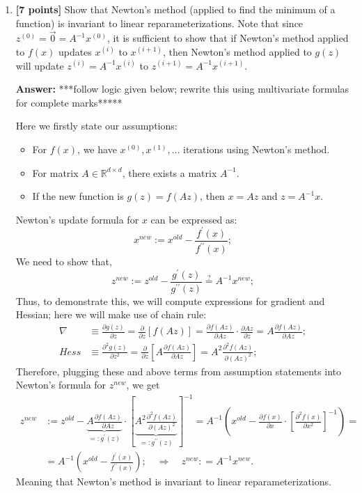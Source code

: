 \documentclass{article}
\begin{document}
\begin{enumerate}[label=\alph*)]
    \item \textbf{[7 points]} Show that Newton's method (applied to find the minimum of a function) is invariant to linear reparameterizations. Note that since $z^{(0)} = \vec{0} = A^{-1}x^{(0)}$, it is sufficient to show that if Newton's method applied to $f(x)$ updates $x^{(i)}$ to $x^{(i+1)}$, then Newton's method applied to $g(z)$ will update $z^{(i)} = A^{-1}x^{(i)}$ to $z^{(i+1)} = A^{-1}x^{(i+1)}$.

\textbf{Answer:}
***follow logic given below; rewrite this using multivariate formulas for complete marks*****

Here we firstly state our assumptions:
\begin{itemize}
\item For $f(x)$, we have $x^{(0)}, x^{(1)}, \ldots$ iterations using Newton's method.
\item For matrix $A \in \mathbb{R}^{d \times d}$, there exists a matrix $A^{-1}$.
\item If the new function is $g(z) = f(Az)$, then $x = Az$ and $z = A^{-1}x$.
\end{itemize}


    Newton's update formula for $x$ can be expressed as:
    \[
    x^{new} := x^{old} - \frac{f^{\prime}(x)}{f^{\prime\prime}(x)};
    \]
    We need to show that,
    \[
     z^{new} := z^{old} - \frac{g^{\prime}(z)}{g^{\prime\prime}(z)} \stackrel{?}{=} A^{-1}x^{new};
    \]
Thus, to demonstrate this, we will compute expressions for gradient and Hessian; here we will make use of chain rule:
\begin{align*}
    \nabla &\equiv\frac{\partial g(z)}{\partial z} = \frac{\partial}{\partial z}\left[ f(Az) \right] = \frac{\partial f(Az)}{\partial Az}\cdot \frac{\partial Az}{\partial z} = A\frac{\partial f(Az)}{\partial Az};\\[8pt]
    Hess &\equiv\frac{\partial^2 g(z)}{\partial z^2} = \frac{\partial}{\partial z}\left[ A\frac{\partial f(Az)}{\partial Az} \right] = A^2\frac{\partial^2 f(Az)}{\partial (Az)^2};
\end{align*}
Therefore, plugging these and above terms from assumption statements into Newton's formula for $z^{new}$, we get
\begin{align*}
 z^{new} &:= z^{old} -  \underbrace{A\frac{\partial f(Az)}{\partial Az}}_{=:g^{\prime}(z)}\cdot\left[\underbrace{A^2\frac{\partial^2 f(Az)}{\partial (Az)^2} }_{=:g^{\prime\prime}(z)}\right]^{-1} =  A^{-1}\left(x^{old} -\frac{\partial f(x)}{\partial x}\cdot \left[\frac{\partial^2 f(x)}{\partial x^2} \right]^{-1} \right) =\\[10pt]
 & = A^{-1}\left(x^{old} - \frac{f^{\prime}(x)}{f^{\prime\prime}(x)}\right);\quad\Rightarrow\quad \boxed{z^{new}: = A^{-1}x^{new}.}
\end{align*}
Meaning that Newton’s method is
invariant to linear reparameterizations. 




\end{enumerate}
\end{document}
